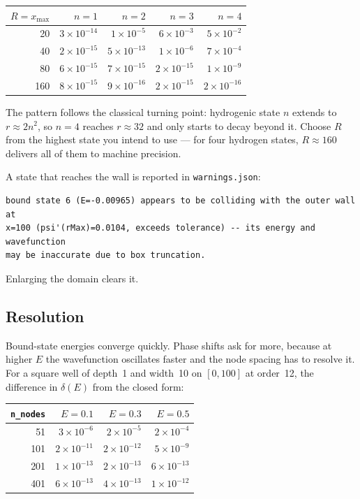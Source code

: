 \documentclass[11pt]{article}
\newcommand{\file}[1]{\texttt{#1}}
\begin{document}
\begin{center}
\begin{tabular}{@{}rrrrr@{}}
\toprule
$R = x_{\max}$ & $n=1$ & $n=2$ & $n=3$ & $n=4$ \\
\midrule
20  & $3\times10^{-14}$ & $1\times10^{-5}$  & $6\times10^{-3}$  & $5\times10^{-2}$ \\
40  & $2\times10^{-15}$ & $5\times10^{-13}$ & $1\times10^{-6}$  & $7\times10^{-4}$ \\
80  & $6\times10^{-15}$ & $7\times10^{-15}$ & $2\times10^{-15}$ & $1\times10^{-9}$ \\
160 & $8\times10^{-15}$ & $9\times10^{-16}$ & $2\times10^{-15}$ & $2\times10^{-16}$ \\
\bottomrule
\end{tabular}
\end{center}

The pattern follows the classical turning point: hydrogenic state $n$ extends
to $r \approx 2n^{2}$, so $n=4$ reaches $r \approx 32$ and only starts to decay
beyond it. Choose $R$ from the highest state you intend to use --- for four
hydrogen states, $R \approx 160$ delivers all of them to machine precision.

A state that reaches the wall is reported in \file{warnings.json}:
\begin{lstlisting}[style=sh]
bound state 6 (E=-0.00965) appears to be colliding with the outer wall at
x=100 (psi'(rMax)=0.0104, exceeds tolerance) -- its energy and wavefunction
may be inaccurate due to box truncation.
\end{lstlisting}
Enlarging the domain clears it.

\subsection{Resolution}

Bound-state energies converge quickly. Phase shifts ask for more, because at
higher $E$ the wavefunction oscillates faster and the node spacing has to
resolve it. For a square well of depth~1 and width~10 on $[0,100]$ at
order~12, the difference in $\delta(E)$ from the closed form:

\begin{center}
\begin{tabular}{@{}rrrr@{}}
\toprule
\texttt{n\_nodes} & $E=0.1$ & $E=0.3$ & $E=0.5$ \\
\midrule
51  & $3\times10^{-6}$  & $2\times10^{-5}$  & $2\times10^{-4}$ \\
101 & $2\times10^{-11}$ & $2\times10^{-12}$ & $5\times10^{-9}$ \\
201 & $1\times10^{-13}$ & $2\times10^{-13}$ & $6\times10^{-13}$ \\
401 & $6\times10^{-13}$ & $4\times10^{-13}$ & $1\times10^{-12}$ \\
\bottomrule
\end{tabular}
\end{center}
\end{document}
